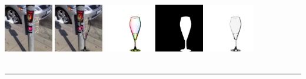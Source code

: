     \\
    \includegraphics[width=0.160\textwidth]{ch-tomnet/images/Ablation/ablation_290_shape79__0000_COCO_val2014_000000040937_ref.jpg}
    \includegraphics[width=0.160\textwidth]{ch-tomnet/images/Ablation/ablation_290_shape79__0000_COCO_val2014_000000040937_tar.jpg}
    \includegraphics[width=0.160\textwidth]{ch-tomnet/images/Ablation/ablation_290_shape_000000040937_gt_fcolor.jpg}
    \includegraphics[width=0.160\textwidth]{ch-tomnet/images/Ablation/ablation_290_shape_000000040937_gt_mask}
    \includegraphics[width=0.160\textwidth]{ch-tomnet/images/Ablation/ablation_290_shape_000000040937_gt_rho.jpg}
    \\ \vspace{-0.4em}\ \hrule\ \\
